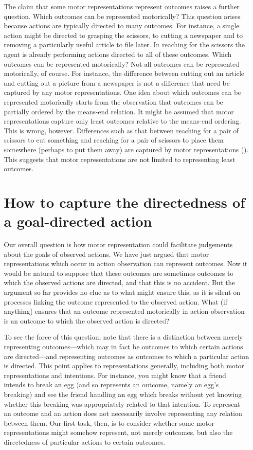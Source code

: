 \documentclass[12pt,\papersize]{extarticle}
\begin{document}
The claim that some motor representations represent outcomes raises a further question.  Which outcomes can be represented motorically?  
This question arises because actions are typically directed to many outcomes.  For instance, a single action might be directed to grasping the scissors, to cutting a newspaper and to removing a particularly useful article to file later.  In reaching for the scissors the agent is already performing actions directed to all of these outcomes.  Which outcomes can be represented motorically?  Not all outcomes can be represented motorically, of course.  For instance, the difference between cutting out an article and cutting out a picture from a newspaper is not a difference that need be captured by any motor representations.  One idea about which outcomes can be represented motorically starts from the observation that outcomes can be partially ordered by the means-end relation. It might be assumed that motor representations capture only least outcomes relative to the means-end ordering.  This is wrong, however.  Differences such as that between reaching for a pair of scissors to cut something and reaching for a pair of scissors to place them somewhere (perhaps to put them away) are captured by motor representations (\citealp{Fogassi:2005nf, cattaneo:2007_impairment, bonini:2010_ventral}). This suggests that motor representations are not limited to representing least outcomes.  


\section{How to capture the directedness of a goal-directed action}
Our overall question is how motor representation could facilitate judgements about the goals of observed actions. We have just argued that motor representations which occur in action observation can represent outcomes. Now it would be natural to suppose that these outcomes are sometimes outcomes to which the observed actions are directed, and that this is no accident.  But the argument so far provides no clue as to what might ensure this, as it is silent on processes linking the outcome represented to the observed action.  What (if anything) ensures that an outcome represented motorically in action observation is an outcome to which the observed action is directed?  

To see the force of this question, note that there is a distinction between merely representing outcomes---which may in fact be outcomes to which certain actions are directed---and representing outcomes as outcomes to which a particular action is directed. This point applies to representations generally, including both motor representations and intentions.  For instance, you might know that a friend intends to break an egg (and so represents an outcome, namely an egg's breaking) and see the friend handling an egg which breaks without yet knowing whether this breaking was appropriately related to that intention.  To represent an outcome and an action does not necessarily involve representing any relation between them.  Our first task, then, is to consider whether some motor representations might somehow represent, not merely outcomes, but also the directedness of particular actions to certain outcomes.  
\end{document}
